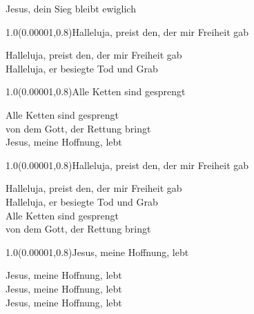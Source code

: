 \documentclass[aspectratio=169]{beamer}
\begin{document}
\begin{frame}
\centering
\color{white}
\huge{Jesus, dein Sieg bleibt ewiglich} \\

\begin{textblock}{1.0}(0.00001,0.8)\color{gray}\normalsize{Halleluja, preist den, der mir Freiheit gab}\end{textblock}
\end{frame}

\begin{frame}
\centering
\color{white}
\huge{Halleluja, preist den, der mir Freiheit gab} \\
\huge{Halleluja, er besiegte Tod und Grab} \\

\begin{textblock}{1.0}(0.00001,0.8)\color{gray}\normalsize{Alle Ketten sind gesprengt}\end{textblock}
\end{frame}

\begin{frame}
\centering
\color{white}
\huge{Alle Ketten sind gesprengt} \\
\huge{von dem Gott, der Rettung bringt} \\
\huge{Jesus, meine Hoffnung, lebt} \\

\begin{textblock}{1.0}(0.00001,0.8)\color{gray}\normalsize{Halleluja, preist den, der mir Freiheit gab}\end{textblock}
\end{frame}

\begin{frame}
\centering
\color{white}
\huge{Halleluja, preist den, der mir Freiheit gab} \\
\huge{Halleluja, er besiegte Tod und Grab} \\
\huge{Alle Ketten sind gesprengt} \\
\huge{von dem Gott, der Rettung bringt} \\

\begin{textblock}{1.0}(0.00001,0.8)\color{gray}\normalsize{Jesus, meine Hoffnung, lebt}\end{textblock}
\end{frame}

\begin{frame}
\centering
\color{white}
\huge{Jesus, meine Hoffnung, lebt} \\
\huge{Jesus, meine Hoffnung, lebt} \\
\huge{Jesus, meine Hoffnung, lebt} \\
\end{frame}
\end{document}

